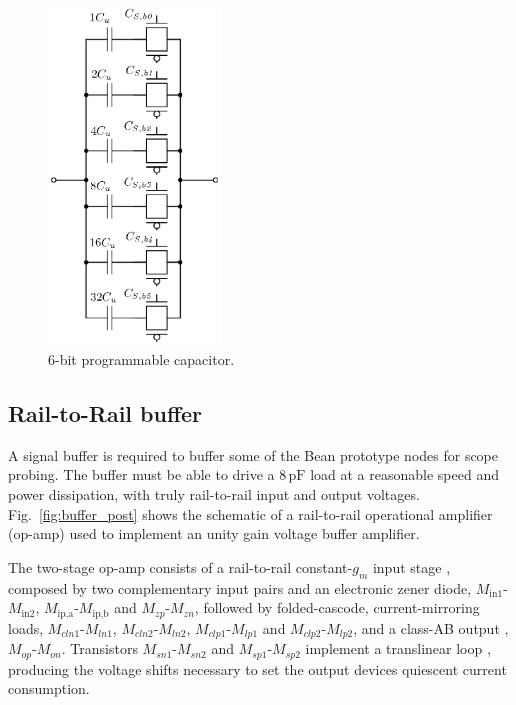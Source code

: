 \begin{figure}[!t]
	\centering
	\includegraphics[width=1.8in]{./Figures/Filter/cap_array_post.eps}
	\caption{6-bit programmable capacitor.}\label{fig:cap_array_post}
\end{figure}

\subsection{Rail-to-Rail buffer}
A signal buffer is required to buffer some of the Bean prototype nodes for scope probing. The buffer must be able to drive a $8\,\text{pF}$ load at a reasonable speed and power dissipation, with truly rail-to-rail input and output voltages. Fig.~\ref{fig:buffer_post} shows the schematic of a rail-to-rail operational amplifier (op-amp) used to implement an unity gain voltage buffer amplifier.

The two-stage op-amp consists of a rail-to-rail constant-$g_m$ input stage \citep{hogervorst101}, composed by two complementary input pairs and an electronic zener diode, $M_\text{in1}$-$M_\text{in2}$, $M_\text{ip,a}$-$M_\text{ip,b}$ and $M_\textit{zp}$-$M_\textit{zn}$,  followed by folded-cascode, current-mirroring loads, \mbox{$M_\textit{cln1}$-$M_\textit{ln1}$}, $M_\textit{cln2}$-$M_\textit{ln2}$, $M_\textit{clp1}$-$M_\textit{lp1}$ and $M_\textit{clp2}$-$M_\textit{lp2}$, and a class-AB output \citep{hogervorst102}, $M_\textit{op}$-$M_\textit{on}$. Transistors $M_\textit{sn1}$-$M_\textit{sn2}$ and $M_\textit{sp1}$-$M_\textit{sp2}$ implement a translinear loop \citep{analogessentials}, producing the voltage shifts necessary to set the output devices quiescent current consumption.

